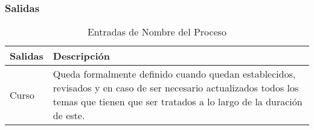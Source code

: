 \subsubsection{Salidas}

\begin{table}[H]
\centering
	\begin{tabular}{p{5cm} p{11cm}}
		\hline
			\textbf{Salidas} & \textbf{Descripción}\\
		\hline
		\hline
			Curso & Queda formalmente definido cuando quedan establecidos, revisados y en caso de ser necesario actualizados todos los temas que tienen que ser tratados a lo largo de la duraci\'on de este.
			\\
	
		\hline	
	\end{tabular}
\caption{Entradas de Nombre del Proceso}
\end{table}
